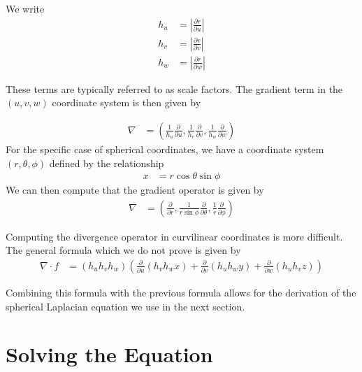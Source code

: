 \documentclass[book.tex]{subfiles}
\begin{document}
We write
\begin{align}
    h_u &= \left | \frac{\partial r}{\partial u} \right | \\
    h_v &= \left | \frac{\partial r}{\partial v} \right | \\
    h_w &= \left | \frac{\partial r}{\partial w} \right | 
\end{align}

These terms are typically referred to as scale factors. The gradient term in the $(u, v, w)$ coordinate system is then given by

\begin{align}
\nabla &= \left ( \frac{1}{h_u} \frac{\partial}{\partial u}, \frac{1}{h_v} \frac{\partial}{\partial v}, \frac{1}{h_w} \frac{\partial}{\partial w} \right )
\end{align}
For the specific case of spherical coordinates, we have a coordinate system $(r, \theta, \phi)$ defined by the relationship
\begin{align}
x &= r \cos \theta \sin \phi
\end{align}
We can then compute that the gradient operator is given by
\begin{align}
\nabla &= \left ( \frac{\partial}{\partial r}, \frac{1}{r \sin \phi} \frac{\partial}{\partial \theta}, \frac{1}{r} \frac{\partial}{\partial \phi} \right) 
\end{align}

Computing the divergence operator in curvilinear coordinates is more difficult. The general formula which we do not prove is given by
\begin{align}
\nabla \cdot f &= \left ( h_u h_v h_w \right ) \left ( \frac{\partial}{\partial u} \left ( h_v h_w  x \right) + \frac{\partial}{\partial v} \left ( h_u h_w  y \right) + \frac{\partial}{\partial w} \left ( h_u h_v  z \right) \right )
\end{align}

Combining this formula with the previous formula allows for the derivation of the spherical Laplacian equation we use in the next section.

\section{Solving the Equation}
\end{document}
